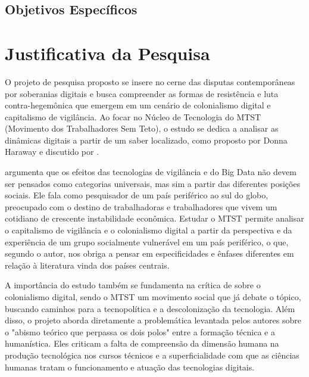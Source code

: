 \subsection{Objetivos Específicos}
\label{subsec:objEs}

\section{Justificativa da Pesquisa}
\label{sec:just}

O projeto de pesquisa proposto se insere no cerne das disputas contemporâneas por soberanias digitais e busca compreender as formas de resistência e luta contra-hegemônica que emergem em um cenário de colonialismo digital e capitalismo de vigilância. Ao focar no Núcleo de Tecnologia do MTST (Movimento dos Trabalhadores Sem Teto), o estudo se dedica a analisar as dinâmicas digitais a partir de um saber localizado, como proposto por Donna Haraway e discutido por .

 argumenta que os efeitos das tecnologias de vigilância e do Big Data não devem ser pensados como categorias universais, mas sim a partir das diferentes posições sociais. Ele fala como pesquisador de um país periférico ao sul do globo, preocupado com o destino de trabalhadoras e trabalhadores que vivem um cotidiano de crescente instabilidade econômica. Estudar o MTST permite analisar o capitalismo de vigilância e o colonialismo digital a partir da perspectiva e da experiência de um grupo socialmente vulnerável em um país periférico, o que, segundo o autor, nos obriga a pensar em especificidades e ênfases diferentes em relação à literatura vinda dos países centrais.

A importância do estudo também se fundamenta na crítica de  sobre o colonialismo digital, sendo o MTST um movimento social que já debate o tópico, buscando caminhos para a tecnopolítica e a descolonização da tecnologia. Além disso, o projeto aborda diretamente a problemática levantada pelos autores sobre o "abismo teórico que perpassa os dois polos" \cite[p.~30]{Faustino2023} entre a formação técnica e a humanística. Eles criticam a falta de compreensão da dimensão humana na produção tecnológica nos cursos técnicos e a superficialidade com que as ciências humanas tratam o funcionamento e atuação das tecnologias digitais. 

